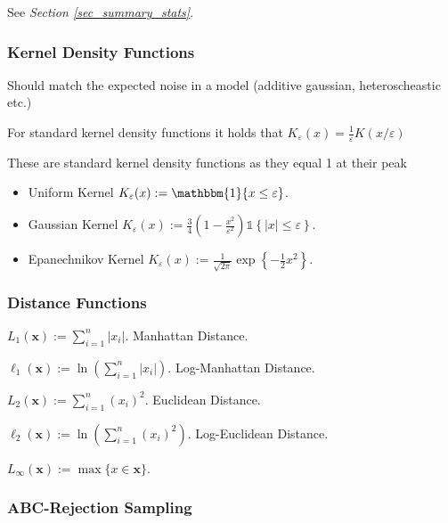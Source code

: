 \documentclass[bibliography=totoc,11pt,a4paper,margin=0]{article}
\theoremstyle{break}
\begin{document}
  \par See \textit{Section \ref{sec_summary_stats}}.

\subsubsection*{Kernel Density Functions}

  \par Should match the expected noise in a model (additive gaussian, heteroscheastic etc.)
  \par For standard kernel density functions it holds that $K_{\varepsilon}(x)=\frac1\varepsilon K(x/\varepsilon)$
  \par These are standard kernel density functions as they equal 1 at their peak %
  \begin{itemize}
    \item Uniform Kernel $K_\varepsilon(x):=\mathbbm{1}\{x\leq\varepsilon\}$.
    \item Gaussian Kernel $K_\varepsilon(x):=\frac34\left(1-\frac{x^2}{\varepsilon^2}\right)\mathbb{1}\left\{|x|\leq\varepsilon\right\}$.
    \item Epanechnikov Kernel $K_\varepsilon(x):=\frac1{\sqrt{2\pi}}\exp\left\{-\frac12x^2\right\}$.
  \end{itemize}

\subsubsection*{Distance Functions}

  \par $L_1(\mathbf{x}):=\sum_{i=1}^n|x_i|$. Manhattan Distance.
  \par $\ell_1(\mathbf{x}):=\ln\left(\sum_{i=1}^n|x_i|\right)$. Log-Manhattan Distance.
  \par $L_2(\mathbf{x}):=\sum_{i=1}^n(x_i)^2$. Euclidean Distance.
  \par $\ell_2(\mathbf{x}):=\ln\left(\sum_{i=1}^n(x_i)^2\right)$. Log-Euclidean Distance.
  \par $L_\infty(\mathbf{x}):=\max\{x\in \mathbf{x}\}$.

\subsubsection{ABC-Rejection Sampling}\label{sec_abc_rejection_sampling}
\end{document}
